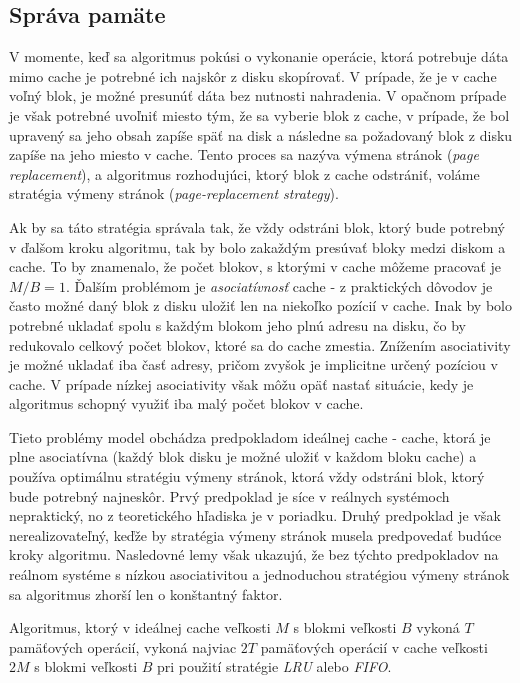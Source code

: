 \subsection{Správa pamäte}
V momente, keď sa \obliv algoritmus pokúsi o vykonanie operácie, ktorá potrebuje dáta mimo cache je potrebné ich najskôr z disku skopírovať. V prípade, že je v cache voľný blok, je možné presunúť dáta bez nutnosti nahradenia. V opačnom prípade je však potrebné uvoľniť miesto tým, že sa vyberie blok z cache, v prípade, že bol upravený sa jeho obsah zapíše späť na disk a následne sa požadovaný blok z disku zapíše na jeho miesto v cache. Tento proces sa nazýva výmena stránok ({\em page replacement}), a algoritmus rozhodujúci, ktorý blok z cache odstrániť, voláme stratégia výmeny stránok ({\em page-replacement strategy}).

Ak by sa táto stratégia správala tak, že vždy odstráni blok, ktorý bude potrebný v ďalšom kroku algoritmu, tak by bolo zakaždým presúvať bloky medzi diskom a cache. To by znamenalo, že počet blokov, s ktorými v cache môžeme pracovať je $M/B = 1$. Ďalším problémom je \emph{asociatívnosť} cache - z praktických dôvodov je často možné daný blok z disku uložiť len na niekoľko pozícií v cache. Inak by bolo potrebné ukladať spolu s každým blokom jeho plnú adresu na disku, čo by redukovalo celkový počet blokov, ktoré sa do cache zmestia. Znížením asociativity je možné ukladať iba časť adresy, pričom zvyšok je implicitne určený pozíciou v cache. V prípade nízkej asociativity však môžu opäť nastať situácie, kedy je algoritmus schopný využiť iba malý počet blokov v cache.

Tieto problémy \obliv model obchádza predpokladom ideálnej cache - cache, ktorá je plne asociatívna (každý blok disku je možné uložiť v každom bloku cache) a používa optimálnu stratégiu výmeny stránok, ktorá vždy odstráni blok, ktorý bude potrebný najneskôr. Prvý predpoklad je síce v reálnych systémoch nepraktický, no z teoretického hľadiska je v poriadku. Druhý predpoklad je však nerealizovateľný, keďže by stratégia výmeny stránok musela predpovedať budúce kroky algoritmu. Nasledovné lemy však ukazujú, že bez týchto predpokladov na reálnom systéme s nízkou asociativitou a jednoduchou stratégiou výmeny stránok sa algoritmus zhorší len o konštantný faktor.

\begin{lema}
Algoritmus, ktorý v ideálnej cache veľkosti $M$ s blokmi veľkosti $B$ vykoná $T$ pamäťových operácií, vykoná najviac $2T$ pamäťových operácií v cache veľkosti $2M$ s blokmi veľkosti $B$ pri použití stratégie \emph{LRU} alebo \emph{FIFO}. \citep[Lemma 12]{frigo1999cache}
\end{lema}

